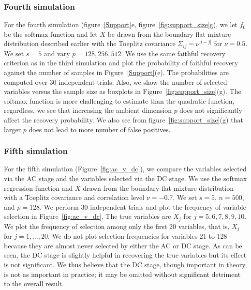\subsubsection{Fourth simulation}
For the \textrm{fourth simulation} (figure~\ref{Support}e, figure~\ref{fig:support_size}g), we let
$f_0$ be the softmax function and let $X$ be drawn from the boundary
flat mixture distribution described earlier with the Toeplitz
covariance $\Sigma_{ij}=\nu^{|i-j|}$ for $\nu = 0.5$. We set $s=5$ and
vary $p=128,256,512$. We use the same faithful recovery criterion as in
the third simulation and plot the probability of faithful recovery
against the number of samples in Figure~\ref{Support}(e). The
probabilities are computed over 30 independent trials. Also, we show the number of selected variables versus the sample
size as boxplots in Figure~\ref{fig:support_size}(g). The softmax function is
more challenging to estimate than the quadratic function, regardless, we
see that increasing the ambient dimension $p$ does not significantly
affect the recovery probability. We also see from figure~\ref{fig:support_size}(g) that larger $p$ does not lead to more number of false positives. 


\subsubsection{Fifth simulation}
For the \textrm{fifth simulation} (Figure~\ref{fig:ac_v_dc}), we
compare the variables selected via the AC stage and the variables
selected via the DC stage. We use the softmax regression function and
$X$ drawn from the boundary flat mixture distribution with a Toeplitz
covariance and correlation level $\nu = -0.7$. We set $s=5$, $n=500$,
and $p=128$. We perform 30 independent trials and plot the frequency of
variable selection in Figure~\ref{fig:ac_v_dc}. The true variables are
$X_j$ for $j=5,6,7,8,9,10$. We plot the frequency of selection among
only the first 20 variables, that is, $X_j$ for $j=1,\ldots,20$. We do
not plot selection frequencies for variables 21 to 128 because they
are almost never selected by either the AC or DC stage. As can be
seen, the DC stage is slightly helpful in recovering the true
variables but its effect is not significant. We thus believe that the
DC stage, though important in theory, is not as important in practice;
it may be omitted without significant detriment to the overall result.


